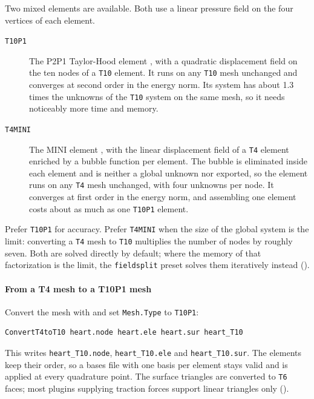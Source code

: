 Two mixed elements are available.
Both use a linear pressure field on the four vertices of each element.
\begin{description}
    \item[\texttt{T10P1}] The P2P1 Taylor-Hood element \cite{taylor1973}, with a quadratic displacement field on the ten nodes of a \verb+T10+ element.
    It runs on any \verb+T10+ mesh unchanged and converges at second order in the energy norm.
    Its system has about 1.3 times the unknowns of the \verb+T10+ system on the same mesh, so it needs noticeably more time and memory.
    \item[\texttt{T4MINI}] The MINI element \cite{arnold1984}, with the linear displacement field of a \verb+T4+ element enriched by a bubble function per element.
    The bubble is eliminated inside each element and is neither a global unknown nor exported, so the element runs on any \verb+T4+ mesh unchanged, with four unknowns per node.
    It converges at first order in the energy norm, and assembling one element costs about as much as one \verb+T10P1+ element.
\end{description}
Prefer \verb+T10P1+ for accuracy.
Prefer \verb+T4MINI+ when the size of the global system is the limit: converting a \verb+T4+ mesh to \verb+T10+ multiplies the number of nodes by roughly seven.
Both are solved directly by default; where the memory of that factorization is the limit, the \verb|fieldsplit| preset solves them iteratively instead ().

\paragraph{From a T4 mesh to a T10P1 mesh}
Convert the mesh with  and set \verb|Mesh.Type| to \verb+T10P1+:
\begin{lstlisting}[language=bash,caption=Converting a T4 mesh for T10P1 elements]
ConvertT4toT10 heart.node heart.ele heart.sur heart_T10
\end{lstlisting}
This writes \verb|heart_T10.node|, \verb|heart_T10.ele| and \verb|heart_T10.sur|.
The elements keep their order, so a bases file with one basis per element stays valid and is applied at every quadrature point.
The surface triangles are converted to \verb+T6+ faces; most plugins supplying traction forces support linear triangles only ().

